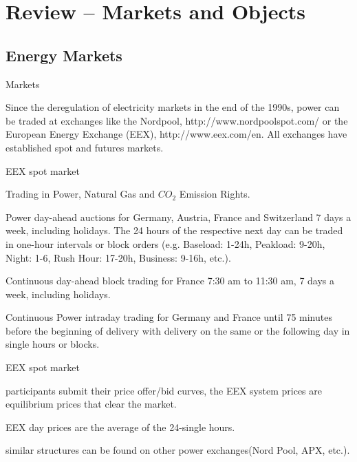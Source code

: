 \section{Review -- Markets and Objects}
\subsection{Energy Markets}

{Markets}

Since the deregulation of electricity markets in the end of the
1990s, power can be traded at exchanges like the Nordpool, http://www.nordpoolspot.com/  or the
European Energy Exchange (EEX), http://www.eex.com/en. All exchanges have established
spot and futures markets.


{EEX spot market}






	Trading in Power, Natural Gas and $CO_2$ Emission Rights.


	Power day-ahead auctions for Germany, Austria, France and Switzerland 7 days a week, including holidays. The 24 hours of the respective next day can be traded in one-hour intervals or block orders (e.g. Baseload: 1-24h, Peakload: 9-20h, Night: 1-6, Rush Hour: 17-20h, Business: 9-16h, etc.).


	Continuous day-ahead block trading for France 7:30 am to 11:30 am, 7 days a week, including holidays.


	Continuous Power intraday trading for Germany and France until 75 minutes before the beginning of delivery with delivery on the same or the following day in single hours or blocks.





{EEX spot market}






	participants submit their price offer/bid curves, the EEX system prices are equilibrium prices that clear the market.


	EEX day prices are the average of the 24-single hours.


	similar structures can be found on other power exchanges(Nord Pool, APX, etc.).


